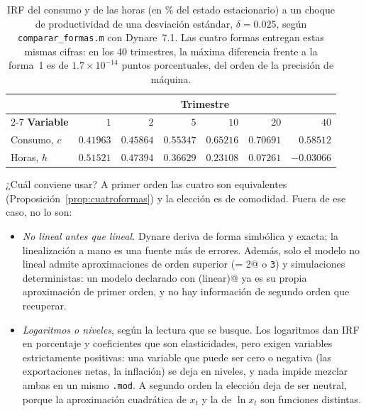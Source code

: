 \documentclass[11pt,a4paper]{report}
\newcounter{tcbrem}[section]
\renewcommand{\thetcbrem}{\thesection.\arabic{tcbrem}}
\newenvironment{remark}{%
  \refstepcounter{tcbrem}%
  \begin{tcolorbox}[remarkstyle, title={Observación~\thetcbrem}]}%
{\end{tcolorbox}}
\newcommand{\code}[1]{\texttt{#1}}
\begin{document}
\begin{table}[H]
\centering\small
\begin{tabular}{lrrrrrr}
\toprule
 & \multicolumn{6}{c}{\textbf{Trimestre}}\\
\cmidrule(lr){2-7}
\textbf{Variable} & $1$ & $2$ & $5$ & $10$ & $20$ & $40$\\
\midrule
Consumo, $c$ & $0.41963$ & $0.45864$ & $0.55347$ & $0.65216$ & $0.70691$ & $0.58512$\\
Horas, $h$   & $0.51521$ & $0.47394$ & $0.36629$ & $0.23108$ & $0.07261$ & $-0.03066$\\
\bottomrule
\end{tabular}
\caption{IRF del consumo y de las horas (en \% del estado estacionario) a un choque
de productividad de una desviación estándar, $\delta=0.025$, según
\code{comparar\_formas.m} con Dynare~7.1. Las cuatro formas entregan estas mismas
cifras: en los 40 trimestres, la máxima diferencia frente a la forma~1 es de
$1.7\times10^{-14}$ puntos porcentuales, del orden de la precisión de máquina.}
\label{tab:cuatroirf}
\end{table}

\begin{remark}
¿Cuál conviene usar? A primer orden las cuatro son equivalentes
(Proposición~\ref{prop:cuatroformas}) y la elección es de comodidad. Fuera de ese
caso, no lo son:
\begin{itemize}[nosep,leftmargin=1.4em]
\item \emph{No lineal antes que lineal.} Dynare deriva de forma simbólica y exacta;
  la linealización a mano es una fuente más de errores. Además, solo el modelo no
  lineal admite aproximaciones de orden superior (\lstinline@order = 2@ o \code{3})
  y simulaciones deterministas: un modelo declarado con \lstinline@model(linear)@ ya
  es su propia aproximación de primer orden, y no hay información de segundo orden
  que recuperar.
\item \emph{Logaritmos o niveles}, según la lectura que se busque. Los logaritmos
  dan IRF en porcentaje y coeficientes que son elasticidades, pero exigen variables
  estrictamente positivas: una variable que puede ser cero o negativa (las
  exportaciones netas, la inflación) se deja en niveles, y nada impide mezclar ambas
  en un mismo \code{.mod}. A segundo orden la elección deja de ser neutral, porque la
  aproximación cuadrática de $x_t$ y la de $\ln x_t$ son funciones distintas.
\end{itemize}
\end{remark}
\end{document}
